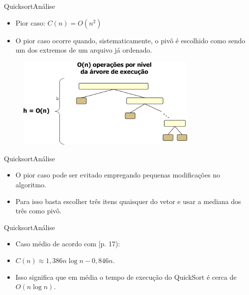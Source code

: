 \documentclass[aspectratio=169]{beamer}
\begin{document}
\begin{frame}{Quicksort}{Análise}
\begin{itemize}
\item Pior caso: $C(n) = O(n^2)$
\item O pior caso ocorre quando, sistematicamente, o pivô é escolhido como sendo um dos extremos de um arquivo já ordenado.
\end{itemize}
\begin{figure}[!h]
  \centering
  \includegraphics[width=250pt]{imgs/analise_quicksort_piorcaso.png}
  \label{fig_analise_quicksort_piorcaso}
\end{figure} 
\end{frame}



\begin{frame}{Quicksort}{Análise}
\begin{itemize}
\item O pior caso pode ser evitado empregando pequenas modificações no algoritmo.
\item Para isso basta escolher três itens quaisquer do vetor e usar a mediana dos três como pivô.
\end{itemize}
\end{frame}



\begin{frame}{Quicksort}{Análise}
\begin{itemize}
\item Caso médio de acordo com [p. 17):
\item $C(n) \approx 1,386n \log n - 0,846n$.
\item Isso significa que em média o tempo de execução do QuickSort é cerca de $O(n \log n)$.
\end{itemize}
\end{frame}


\end{document}
